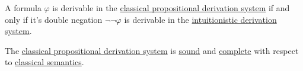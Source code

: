 \begin{theorem}\label{thm:glivenkos_double_negation_theorem}
  A formula \( \varphi \) is derivable in the \hyperref[def:propositional_derivation_system]{classical propositional derivation system} if and only if it's double negation \( \neg \neg \varphi \) is derivable in the \hyperref[def:intuitionistic_propositional_derivation_system]{intuitionistic derivation system}.
\end{theorem}

\begin{theorem}\label{thm:classical_propositional_logic_is_sound_and_complete}
  The \hyperref[def:propositional_derivation_system]{classical propositional derivation system} is \hyperref[def:derivability_and_satisfiability/soundness]{sound} and \hyperref[def:derivability_and_satisfiability/completeness]{complete} with respect to \hyperref[def:propositional_semantics]{classical semantics}.
\end{theorem}

\medskip

